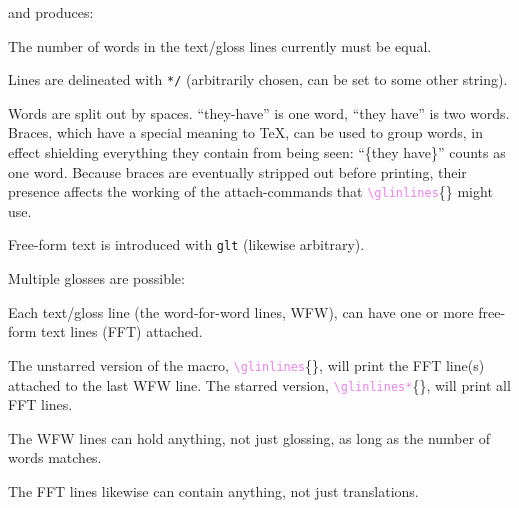 \documentclass{article}
\newcommand\glcmd[1]{\textcolor{violet}{\texttt{\textbackslash#1}}}
\newcommand\glcmdb[1]{\glcmd{#1}\{\}}
\begin{document}
and produces:

\begin{exe}
\ex
{}
\end{exe}

The number of words in the text/gloss lines currently must be equal.

Lines are delineated with \verb|*/| (arbitrarily chosen, can be set to some other string).

Words are split out by spaces. ``they-have'' is one word, ``they have'' is two words. Braces, which have a special meaning to \TeX, can be used to group words, in effect shielding everything they contain from being seen: ``\{they have\}'' counts as one word. Because braces are eventually stripped out before printing, their presence affects the working of the attach-commands that \glcmdb{glinlines} might use.

Free-form text is introduced with \verb|glt| (likewise arbitrary).

Multiple glosses are possible:


\begin{exe}
    \ex
{}
\end{exe}

Each text/gloss line (the word-for-word lines, WFW), can have one or more free-form text lines (FFT) attached.

The unstarred version of the macro, \glcmdb{glinlines}, will print the FFT line(s) attached to the last WFW line. The starred version, \glcmdb{glinlines*}, will print all FFT lines.

\begin{exe}
    \ex
{}
\end{exe}



The WFW lines can hold anything, not just glossing, as long as the number of words matches.

The FFT lines likewise can contain anything, not just translations.
\end{document}
